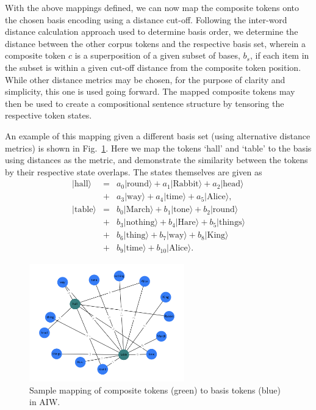 With the above mappings defined, we can now map the composite tokens onto the chosen basis encoding using a distance cut-off. Following the inter-word distance calculation approach used to determine basis order, we determine the distance between the other corpus tokens and the respective basis set, wherein a composite token $c$ is a superposition of a given subset of bases, $b_s$, if each item in the subset is within a given cut-off distance from the composite token position. While other distance metrics may be chosen, for the purpose of clarity and simplicity, this one is used going forward. The mapped composite tokens may then be used to create a compositional sentence structure by tensoring the respective token states. 

An example of this mapping given a different basis set (using alternative distance metrics) is shown in Fig.~\ref{fig:aiw_composite_map}. Here we map the tokens `hall' and `table' to the basis using distances as the metric, and demonstrate the similarity between the tokens by their respective state overlaps. The states themselves are given as 
\begin{equation}
\begin{array}{lll}
\vert \textrm{hall} \rangle &= &a_0\vert \textrm{round} \rangle + a_1\vert \textrm{Rabbit} \rangle + a_2\vert \textrm{head} \rangle \\
 & + &a_3\vert \textrm{way} \rangle + a_4\vert \textrm{time} \rangle + a_5\vert \textrm{Alice} \rangle, \\
\vert \textrm{table} \rangle &= &b_{0}\vert \textrm{March} \rangle  + b_{1}\vert \textrm{tone} \rangle  + b_{2}\vert \textrm{round} \rangle  \\
 & + &b_{3}\vert \textrm{nothing} \rangle  + b_{4}\vert \textrm{Hare} \rangle + b_{5}\vert \textrm{things} \rangle  \\ 
 & + & b_{6}\vert \textrm{thing} \rangle  + b_{7}\vert \textrm{way} \rangle  + b_{8}\vert \textrm{King} \rangle \\ & + &b_{9}\vert \textrm{time} \rangle  + b_{10}\vert \textrm{Alice} \rangle.
\end{array}
\end{equation}

\begin{figure}[htbp]
    \centering
    \includegraphics[width=0.6\textwidth]{Images/aiw_composite_mapped.png}
    \caption{Sample mapping of composite tokens (green) to basis tokens (blue) in AIW.}
    \label{fig:aiw_composite_map}
\end{figure}
